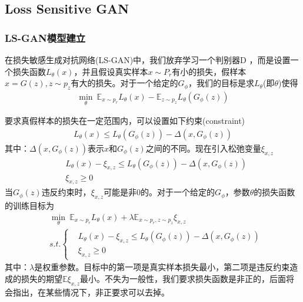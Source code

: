     \subsection{Loss Sensitive GAN}
        \subsubsection{LS-GAN模型建立}
            \par
            在损失敏感生成对抗网络(LS-GAN)中，我们放弃学习一个判别器D ，而是设置一个损失函数$L_\theta(x)$，并且假设真实样本$x\sim P_r$有小的损失，假样本$x = G(z),z\sim p_z$有大的损失。对于一个给定的$G_\phi$，我们的目标是求$L_\theta$(即$\theta$)使得
            \begin{align*}
            \min_\theta \ \mathbb{E}_{x\sim p_r}L_\theta(x) - \mathbb{E}_{z\sim p_z}L_\theta(G_\phi(z))
            \end{align*}
            \par
            要求真假样本的损失在一定范围内，可以设置如下约束(constraint)
            \begin{align*}
            L_\theta(x)  \leqslant L_\theta(G_\phi(z)) - \Delta(x,G_\phi(z))
            \end{align*}
            其中：$\Delta(x,G_\phi(z))$表示$x$和$G_\phi(z)$之间的不同。现在引入松弛变量$\xi_{x,z}$
            \begin{align*}
            & L_\theta(x) - \xi_{x,z} \leqslant L_\theta(G_\phi(z)) - \Delta(x,G_\phi(z))\\
            & \xi_{x,z} \geqslant 0
            \end{align*}
            当$G_\phi(z)$违反约束时，$\xi_{x,z}$可能是非0的。对于一个给定的$G_\phi$，参数$\theta$的损失函数的训练目标为
            \begin{align*}
            &\min_\theta \ \mathbb{E}_{x\sim p_r} L_\theta(x) + \lambda \mathbb{E}_{x\sim p_r,z\sim p_z} \xi_{x,z}\\
            &s.t. \left\{
            \begin{aligned}
            & L_\theta(x) - \xi_{x,z}  \leqslant L_\theta(G_\phi(z)) - \Delta(x,G_\phi(z))\\
            & \xi_{x,z} \geqslant 0
            \end{aligned}
            \right.
            \end{align*}
            其中：$\lambda$是权重参数。目标中的第一项是真实样本损失最小，第二项是违反约束造成的损失的期望$\mathbb{E} \xi_{x,z}$最小。不失为一般性，我们要求损失函数是非正的，后面将会指出，在某些情况下，非正要求可以去掉。
